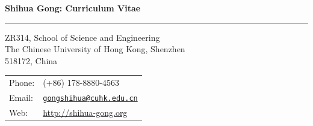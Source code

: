\documentclass[letterpaper]{article}
\def\name{Shihua Gong}
\begin{document}
{\huge \bf \name: Curriculum Vitae}

\rule{12cm}{0.02cm}




\begin{minipage}{0.55\linewidth}
ZR314, School  of Science and Engineering\\
 The Chinese University of Hong Kong, Shenzhen\\
518172, China 
\end{minipage}
\begin{minipage}{0.45\linewidth}
  \begin{tabular}{ll}
    Phone: & (+86) 178-8880-4563\\
    Email: & \href{mailto:gongshihua@cuhk.edu.cn}{\tt gongshihua@cuhk.edu.cn} \\
    Web:& \url{http://shihua-gong.org}
  \end{tabular}
\end{minipage}



%
%
\end{document}
